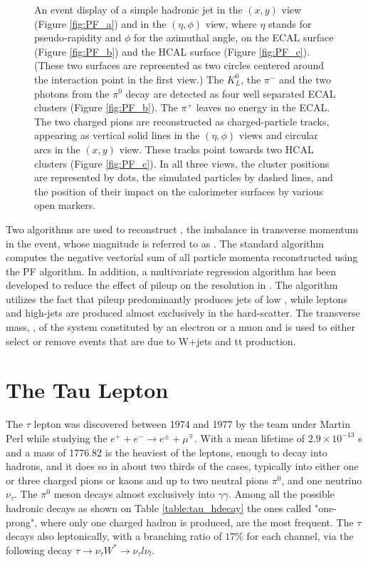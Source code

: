 \begin{figure}
	\caption{An event display of a simple hadronic jet in the $(x, y)$ view (Figure \ref{fig:PF_a}) and in the $(\eta,\phi)$ view, where $\eta$ stands for pseudo-rapidity and $\phi$ for the azimuthal angle, on the ECAL surface (Figure \ref{fig:PF_b}) and the HCAL surface (Figure \ref{fig:PF_c}). (These two surfaces are represented as two circles centered around the interaction point in the first view.) The $K^{0}_{L}$, the $\pi^{-}$ and the two photons from the $\pi^{0}$ decay are detected as four well separated ECAL clusters (Figure \ref{fig:PF_b}). The $\pi^{+}$ leaves no energy in the ECAL. The two charged pions are reconstructed as charged-particle tracks, appearing as vertical solid lines in the $(\eta,\phi)$ views and circular arcs in the $(x, y)$ view. These tracks point towards two HCAL clusters (Figure \ref{fig:PF_c}). In all three views, the cluster positions are represented by dots, the simulated particles by dashed lines, and the position of their impact on the calorimeter surfaces by various open markers.}
	\label{fig:PF_event_display}
\end{figure}

Two algorithms are used to reconstruct \ptvecmiss, the imbalance in transverse momentum in the event, whose magnitude is referred to as \met. The standard algorithm computes the negative vectorial sum of all particle momenta reconstructed using the PF algorithm. In addition, a multivariate regression algorithm \cite{Khachatryan:2014gga} has been developed to reduce the effect of pileup on the resolution in \met. The algorithm utilizes the fact that pileup predominantly produces jets of low \pt, while leptons and high-\pt jets are produced almost exclusively in the hard-scatter. The transverse mass, \mt, of the system constituted by an electron or a muon and \met is used to either select or remove events that are due to W+jets and tt production. 

\clearpage

\section {The Tau Lepton}

The $\tau$ lepton was discovered between 1974 and 1977 by the team under Martin Perl while studying the $e^{+}+e^{-}\longrightarrow e^{\pm}+\mu^{\mp}$. With a mean lifetime of $2.9\times10^{−13}$ s and a mass of 1776.82 \mev \cite{Agashe:2014kda} is the heaviest of the leptons, enough to decay into hadrons, and it does so in about two thirds of the cases, typically into either one or three charged pions or kaons and up to two neutral pions \ensuremath{\pi^{0}}, and one neutrino \ensuremath{\nu_{\tau}}. The \ensuremath{\pi^{0}} meson decays almost exclusively into \ensuremath{\gamma\gamma}. Among all the possible hadronic decays as shown on Table \ref{table:tau_hdecay} the ones called "one-prong", where only one charged hadron is produced, are the most frequent. The $\tau$ decays also leptonically, with a branching ratio of $17\%$ for each channel, via the following decay $\tau\longrightarrow\nu_{\tau}W^{*}\longrightarrow\nu_{\tau}l\nu_{l}$.


